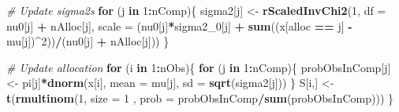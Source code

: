 \documentclass[]{article}
\newenvironment{Shaded}{\begin{snugshade}}{\end{snugshade}}
\newcommand{\CommentTok}[1]{\textcolor[rgb]{0.56,0.35,0.01}{\textit{#1}}}
\newcommand{\ControlFlowTok}[1]{\textcolor[rgb]{0.13,0.29,0.53}{\textbf{#1}}}
\newcommand{\DataTypeTok}[1]{\textcolor[rgb]{0.13,0.29,0.53}{#1}}
\newcommand{\DecValTok}[1]{\textcolor[rgb]{0.00,0.00,0.81}{#1}}
\newcommand{\KeywordTok}[1]{\textcolor[rgb]{0.13,0.29,0.53}{\textbf{#1}}}
\newcommand{\NormalTok}[1]{#1}
\newcommand{\OperatorTok}[1]{\textcolor[rgb]{0.81,0.36,0.00}{\textbf{#1}}}
\newcommand{\StringTok}[1]{\textcolor[rgb]{0.31,0.60,0.02}{#1}}
\begin{document}
\begin{Shaded}
\begin{Highlighting}[]
  \CommentTok{\# Update sigma2\textquotesingle{}s}
  \ControlFlowTok{for}\NormalTok{ (j }\ControlFlowTok{in} \DecValTok{1}\OperatorTok{:}\NormalTok{nComp)\{}
\NormalTok{    sigma2[j] \textless{}{-}}\StringTok{ }\KeywordTok{rScaledInvChi2}\NormalTok{(}\DecValTok{1}\NormalTok{, }\DataTypeTok{df =}\NormalTok{ nu0[j] }\OperatorTok{+}\StringTok{ }\NormalTok{nAlloc[j], }\DataTypeTok{scale =}\NormalTok{ (nu0[j]}\OperatorTok{*}\NormalTok{sigma2\_}\DecValTok{0}\NormalTok{[j] }\OperatorTok{+}\StringTok{ }\KeywordTok{sum}\NormalTok{((x[alloc }\OperatorTok{==}\StringTok{ }\NormalTok{j] }\OperatorTok{{-}}\StringTok{ }\NormalTok{mu[j])}\OperatorTok{\^{}}\DecValTok{2}\NormalTok{))}\OperatorTok{/}\NormalTok{(nu0[j] }\OperatorTok{+}\StringTok{ }\NormalTok{nAlloc[j]))}
\NormalTok{  \}}
  
  \CommentTok{\# Update allocation}
  \ControlFlowTok{for}\NormalTok{ (i }\ControlFlowTok{in} \DecValTok{1}\OperatorTok{:}\NormalTok{nObs)\{}
    \ControlFlowTok{for}\NormalTok{ (j }\ControlFlowTok{in} \DecValTok{1}\OperatorTok{:}\NormalTok{nComp)\{}
\NormalTok{      probObsInComp[j] \textless{}{-}}\StringTok{ }\NormalTok{pi[j]}\OperatorTok{*}\KeywordTok{dnorm}\NormalTok{(x[i], }\DataTypeTok{mean =}\NormalTok{ mu[j], }\DataTypeTok{sd =} \KeywordTok{sqrt}\NormalTok{(sigma2[j]))}
\NormalTok{    \}}
\NormalTok{    S[i,] \textless{}{-}}\StringTok{ }\KeywordTok{t}\NormalTok{(}\KeywordTok{rmultinom}\NormalTok{(}\DecValTok{1}\NormalTok{, }\DataTypeTok{size =} \DecValTok{1}\NormalTok{ , }\DataTypeTok{prob =}\NormalTok{ probObsInComp}\OperatorTok{/}\KeywordTok{sum}\NormalTok{(probObsInComp)))}
\NormalTok{  \}}
  

\end{Highlighting}
\end{Shaded}
\end{document}
